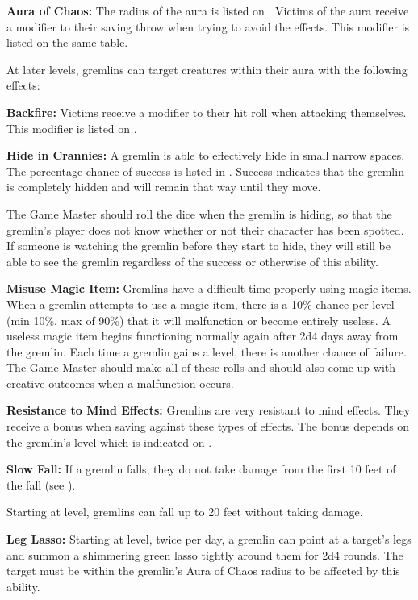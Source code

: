 \begin{multicols*}{2}
\textbf{Aura of Chaos:} The radius of the aura is listed on . Victims of the aura receive a modifier to their saving throw when trying to avoid the effects. This modifier is listed on the same table.

At later levels, gremlins can target creatures within their aura with the following effects:

\textbf{Backfire:} Victims receive a modifier to their hit roll when attacking themselves. This modifier is listed on .

\textbf{Hide in Crannies:} A gremlin is able to effectively hide in small narrow spaces. The percentage chance of success is listed in . Success indicates that the gremlin is completely hidden and will remain that way until they move.

The Game Master should roll the dice when the gremlin is hiding, so that the gremlin’s player does not know whether or not their character has been spotted. If someone is watching the gremlin before they start to hide, they will still be able to see the gremlin regardless of the success or otherwise of this ability.

\textbf{Misuse Magic Item:} Gremlins have a difficult time properly using magic items. When a gremlin attempts to use a magic item, there is a 10\% chance per level (min 10\%, max of 90\%) that it will malfunction or become entirely useless. A useless magic item begins functioning normally again after 2d4 days away from the gremlin. Each time a gremlin gains a level, there is another chance of failure. The Game Master should make all of these rolls and should also come up with creative outcomes when a malfunction occurs.

\textbf{Resistance to Mind Effects:} Gremlins are very resistant to mind effects. They receive a bonus when saving against these types of effects. The bonus depends on the gremlin's level which is indicated on .

\textbf{Slow Fall:} If a gremlin falls, they do not take damage from the first 10 feet of the fall (see ). 

Starting at  level, gremlins can fall up to 20 feet without taking damage.

\textbf{Leg Lasso:} Starting at  level, twice per day, a gremlin can point at a target's legs and summon a shimmering green lasso tightly around them for 2d4 rounds. The target must be within the gremlin's Aura of Chaos radius to be affected by this ability.


\end{multicols*}

